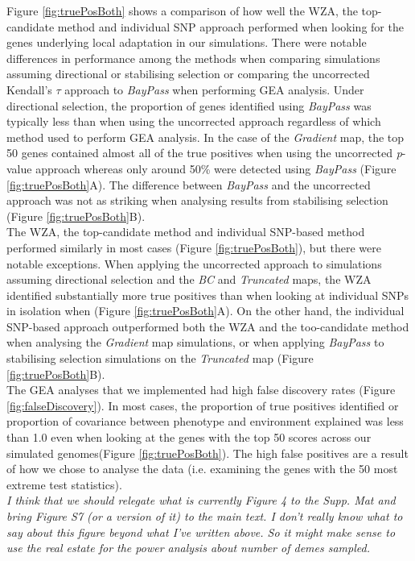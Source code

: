 \documentclass[10pt,twoside,lineno]{GSA_format}
\begin{document}
Figure \ref{fig:truePosBoth} shows a comparison of how well the WZA, the top-candidate method and individual SNP approach performed when looking for the genes underlying local adaptation in our simulations. There were notable differences in performance among the methods when comparing simulations assuming directional or stabilising selection or comparing the uncorrected Kendall's $\tau$ approach to \textit{BayPass} when performing GEA analysis. Under directional selection, the proportion of genes identified using \textit{BayPass} was typically less than when using the uncorrected approach regardless of which method used to perform GEA analysis. In the case of the \textit{Gradient} map, the top 50 genes contained almost all of the true positives when using the uncorrected \textit{p}-value approach whereas only around 50\% were detected using \textit{BayPass} (Figure \ref{fig:truePosBoth}A). The difference between \textit{BayPass} and the uncorrected approach was not as striking when analysing results from stabilising selection (Figure \ref{fig:truePosBoth}B).\\

The WZA, the top-candidate method and individual SNP-based method performed similarly in most cases (Figure \ref{fig:truePosBoth}), but there were notable exceptions. When applying the uncorrected approach to simulations assuming directional selection and the \textit{BC} and \textit{Truncated} maps, the WZA identified substantially more true positives than when looking at individual SNPs in isolation when (Figure \ref{fig:truePosBoth}A). On the other hand, the individual SNP-based approach outperformed both the WZA and the too-candidate method when analysing the \textit{Gradient} map simulations, or when applying \textit{BayPass} to stabilising selection simulations on the \textit{Truncated} map (Figure \ref{fig:truePosBoth}B). \\

The GEA analyses that we implemented had high false discovery rates (Figure \ref{fig:falseDiscovery}). In most cases, the proportion of true positives identified or proportion of covariance between phenotype and environment explained was less than 1.0 even when looking at the genes with the top 50 scores across our simulated genomes(Figure \ref{fig:truePosBoth}). The high false positives are a result of how we chose to analyse the data (i.e. examining the genes with the 50 most extreme test statistics).  \\

\textit{I think that we should relegate what is currently Figure 4 to the Supp. Mat and bring Figure S7 (or a version of it) to the main text. I don't really know what to say about this figure beyond what I've written above. So it might make sense to use the real estate for the power analysis about number of demes sampled.}\\
\end{document}
